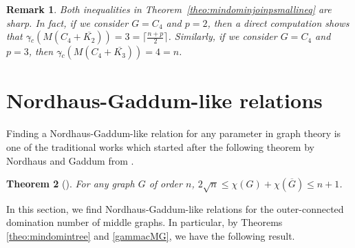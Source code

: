 \documentclass[a4paper,12pt, reqno]{amsart}
\newtheorem{Theorem}{Theorem}[section]
\newtheorem{Remark}[Theorem]{Remark}
\begin{document}
\begin{Remark} Both inequalities in Theorem~\ref{theo:mindominjoinpsmallineq} are sharp. In fact, if we consider $G=C_4$ and $p=2$, then a direct computation shows that $\gamma{\tilde{}} _{c}(M(C_4+\overline{K_2}))=3=\lceil\frac{n+p}{2}\rceil$. Similarly, if we consider $G=C_4$ and $p=3$, then $\gamma{\tilde{}} _{c}(M(C_4+\overline{K_3}))=4=n$. 
\end{Remark}
\section{Nordhaus-Gaddum-like relations}

Finding a Nordhaus-Gaddum-like relation for any parameter in graph theory is one of the traditional works which started after the following theorem by Nordhaus and Gaddum from \cite{Nordhaus}.

\begin{Theorem}[\cite{Nordhaus}]\label{Nordhaus and Gaddum}
	For any graph $G$ of order $n$, $2\sqrt{n}\leq \chi(G)+\chi(\overline{G}) \leq n+1$.
\end{Theorem}

In this section, we find Nordhaus-Gaddum-like relations for the outer-connected  domination number of middle graphs.
In particular, by Theorems \ref{theo:mindomintree} and \ref{gammacMG}, we have the following result.
\vskip 0.02cm
\end{document}

